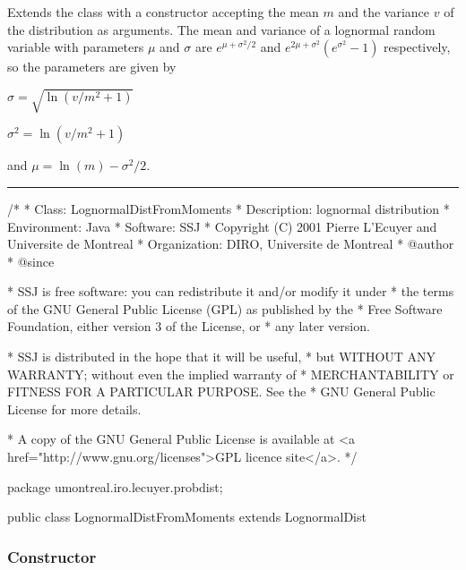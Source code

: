
Extends the  class with a constructor accepting the
mean $m$ and the variance $v$ of the distribution as arguments.
The mean and variance of a lognormal random variable with
parameters $\mu$ and $\sigma$ are
$e^{\mu+\sigma^2/2}$ and
$e^{2\mu + \sigma^2}(e^{\sigma^2} - 1)$ respectively, so
the parameters are given by
\begin{latexonly} $\sigma=\sqrt{\ln(v/m^2+1)}$ \end{latexonly}
\begin{htmlonly}  $\sigma^2={\ln(v/m^2+1)}$ \end{htmlonly}
and
$\mu=\ln(m) - \sigma^2/2$.

\bigskip\hrule\bigskip

\begin{code}
\begin{hide}
/*
 * Class:        LognormalDistFromMoments
 * Description:  lognormal distribution
 * Environment:  Java
 * Software:     SSJ 
 * Copyright (C) 2001  Pierre L'Ecuyer and Universite de Montreal
 * Organization: DIRO, Universite de Montreal
 * @author       
 * @since

 * SSJ is free software: you can redistribute it and/or modify it under
 * the terms of the GNU General Public License (GPL) as published by the
 * Free Software Foundation, either version 3 of the License, or
 * any later version.

 * SSJ is distributed in the hope that it will be useful,
 * but WITHOUT ANY WARRANTY; without even the implied warranty of
 * MERCHANTABILITY or FITNESS FOR A PARTICULAR PURPOSE.  See the
 * GNU General Public License for more details.

 * A copy of the GNU General Public License is available at
   <a href="http://www.gnu.org/licenses">GPL licence site</a>.
 */
\end{hide}
package umontreal.iro.lecuyer.probdist;


public class LognormalDistFromMoments extends LognormalDist\begin{hide} {
\end{hide}
\end{code}


\subsubsection* {Constructor}


